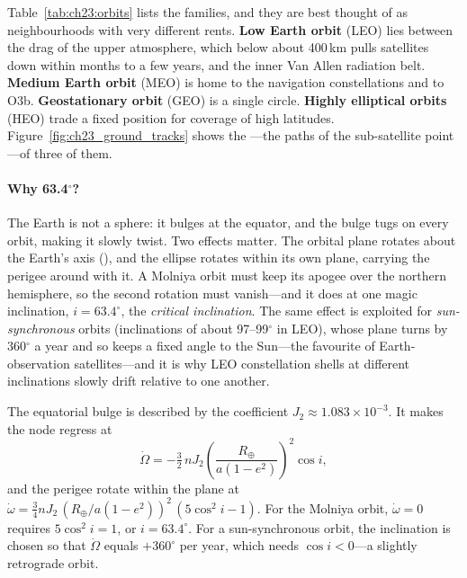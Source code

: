 Table~\ref{tab:ch23:orbits} lists the families, and they are best thought of as neighbourhoods
with very different rents. \textbf{Low Earth orbit} (LEO) lies between
the drag of the upper atmosphere, which below about 400\,km pulls satellites down within months
to a few years, and the inner Van Allen radiation belt. \textbf{Medium Earth orbit}
(MEO) is home to the navigation constellations and to O3b. \textbf{Geostationary orbit}
(GEO) is a single circle. \textbf{Highly elliptical orbits} (HEO)
trade a fixed position for coverage of high latitudes. Figure~\ref{fig:ch23_ground_tracks} shows
the ---the paths of the sub-satellite point---of three of them.


\paragraph{Why 63.4$^\circ$?} The Earth is not a sphere: it bulges at the equator, and the bulge
tugs on every orbit, making it slowly twist. Two effects matter. The orbital plane rotates about
the Earth's axis (), and the ellipse rotates within its own plane, carrying
the perigee around with it. A Molniya orbit must keep its apogee over the northern hemisphere, so
the second rotation must vanish---and it does at one magic inclination, $i=63.4^\circ$, the
\emph{critical inclination}. The same effect is exploited for \emph{sun-synchronous} orbits
(inclinations of about 97--99$^\circ$ in LEO), whose plane turns by 360$^\circ$ a year and so keeps a
fixed angle to the Sun---the favourite of Earth-observation satellites---and it is why LEO
constellation shells at different inclinations slowly drift relative to one another.

\begin{deeper}
The equatorial bulge is described by the coefficient $J_2\approx1.083\times10^{-3}$. It makes the
node regress at
\begin{equation}
\dot\Omega=-\tfrac32\,nJ_2\left(\frac{R_\oplus}{a(1-e^2)}\right)^2\cos i ,
\end{equation}
and the perigee rotate within the plane at
$\dot\omega=\tfrac34 nJ_2\,(R_\oplus/a(1-e^2))^2\,(5\cos^2 i-1)$. For the Molniya orbit,
$\dot\omega=0$ requires $5\cos^2i=1$, or $i=63.4^\circ$. For a sun-synchronous orbit, the
inclination is chosen so that $\dot\Omega$ equals $+360^\circ$ per year, which needs
$\cos i<0$---a slightly retrograde orbit.
\end{deeper}

